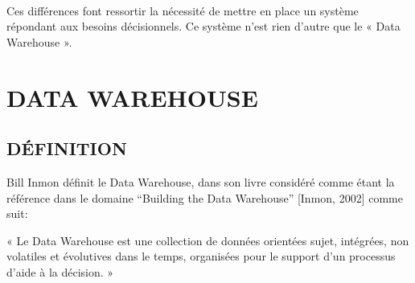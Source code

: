 \paragraph{}
	Ces différences font ressortir la nécessité de mettre en place un système répondant aux besoins décisionnels. Ce système n’est rien d’autre que le « Data Warehouse ».


\section{DATA WAREHOUSE}
 \subsection{ DÉFINITION}
 Bill Inmon définit le Data Warehouse, dans son livre considéré comme étant la référence dans le domaine ``Building the Data Warehouse'' [Inmon, 2002] comme suit:
 
« Le Data Warehouse est une collection de données orientées sujet, intégrées, non volatiles et évolutives dans le temps, organisées pour le support d’un processus d’aide à la décision. »

